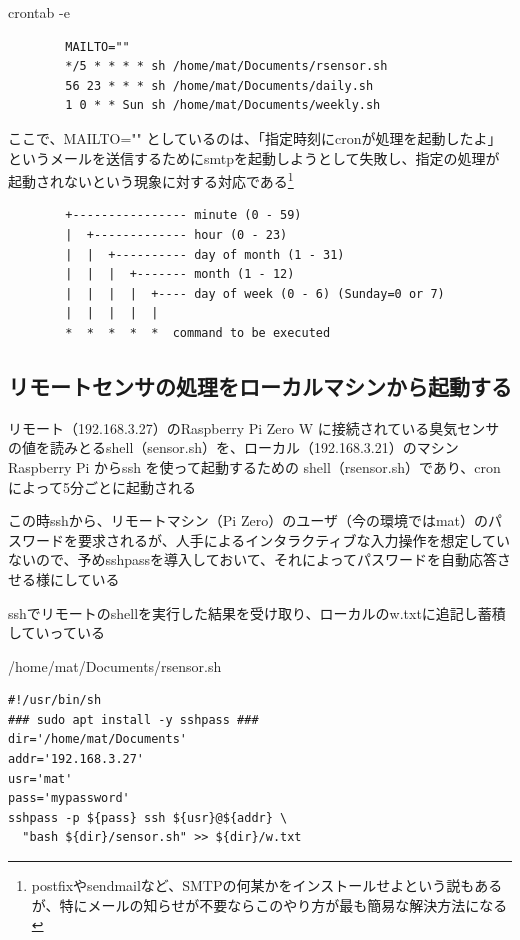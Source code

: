 \documentclass[12pt,a4paper,uplatex]{jsbook}
\begin{document}
\begin{itembox}[l]{crontab -e}
	\begin{verbatim}
		MAILTO=""
		*/5 * * * * sh /home/mat/Documents/rsensor.sh
		56 23 * * * sh /home/mat/Documents/daily.sh
		1 0 * * Sun sh /home/mat/Documents/weekly.sh
	\end{verbatim}
\end{itembox}

ここで、MAILTO="" としているのは、「指定時刻にcronが処理を起動したよ」というメールを送信するためにsmtpを起動しようとして失敗し、指定の処理が起動されないという現象に対する対応である\footnote{postfixやsendmailなど、SMTPの何某かをインストールせよという説もあるが、特にメールの知らせが不要ならこのやり方が最も簡易な解決方法になる}

\begin{screen}
	\begin{verbatim}
		+---------------- minute (0 - 59)
		|  +------------- hour (0 - 23)
		|  |  +---------- day of month (1 - 31)
		|  |  |  +------- month (1 - 12)
		|  |  |  |  +---- day of week (0 - 6) (Sunday=0 or 7)
		|  |  |  |  |
		*  *  *  *  *  command to be executed
	\end{verbatim}
\end{screen}


\newpage

\subsection{リモートセンサの処理をローカルマシンから起動する}

リモート（192.168.3.27）のRaspberry Pi Zero W に接続されている臭気センサの値を読みとるshell（sensor.sh）を、ローカル（192.168.3.21）のマシンRaspberry Pi からssh を使って起動するための shell（rsensor.sh）であり、cronによって5分ごとに起動される

この時sshから、リモートマシン（Pi Zero）のユーザ（今の環境ではmat）のパスワードを要求されるが、人手によるインタラクティブな入力操作を想定していないので、予めsshpassを導入しておいて、それによってパスワードを自動応答させる様にしている

sshでリモートのshellを実行した結果を受け取り、ローカルのw.txtに追記し蓄積していっている

\begin{itembox}[l]{/home/mat/Documents/rsensor.sh}
	\begin{verbatim}
#!/usr/bin/sh
### sudo apt install -y sshpass ###
dir='/home/mat/Documents'
addr='192.168.3.27'
usr='mat'
pass='mypassword'
sshpass -p ${pass} ssh ${usr}@${addr} \
  "bash ${dir}/sensor.sh" >> ${dir}/w.txt
	\end{verbatim}
\end{itembox}
\end{document}
